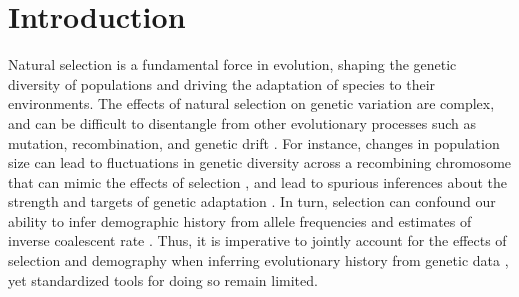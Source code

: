 \documentclass[hidelinks]{article}
\begin{document}
\section*{Introduction}
    \label{introduction}
    Natural selection is a fundamental force in evolution, shaping the
    genetic diversity of populations and driving the adaptation of
    species to their environments. The effects of natural selection
    on genetic variation are complex, and can be difficult to disentangle
    from other evolutionary processes such as mutation, recombination,
    and genetic drift \citep[e.g.,][]{gillespie1991causes}.
    For instance, changes in population size can lead to fluctuations
    in genetic diversity across a recombining chromosome 
    that can mimic the effects of selection \citep{simonsen1995properties},
    and lead to spurious inferences about the strength and targets of genetic adaptation
    \citep{simonsen1995properties,akey2004population,nielsen2005genomic}.
    In turn, selection can confound our ability to infer demographic 
    history from allele frequencies \citep{ewing2016consequences,schrider2016effects} and
    estimates of inverse coalescent rate \citep{schrider2016effects, johri2021impact, cousins2024accurate}.
    Thus, it is imperative to jointly account for the effects of selection
    and demography when inferring evolutionary history from genetic data \citep[e.g.,][]{sheehan2016deep,johri2020toward},
    yet standardized tools for doing so remain limited.
\end{document}
